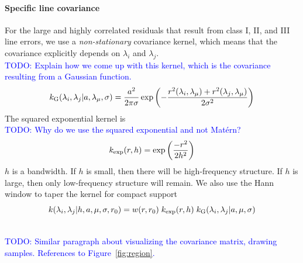 \documentclass[iop,floatfix]{emulateapj}
\newcommand{\matern}{Mat\'{e}rn}
\newcommand{\todo}[1]{ \textcolor{Blue}{\\TODO: #1}}
\begin{document}
\paragraph{Specific line covariance} For the large and highly correlated
 residuals that result from class I, II, and III line errors, we use a
 \emph{non-stationary} covariance kernel, which means that the covariance
 explicitly depends on $\lambda_i$ and $\lambda_j$.
\todo{Explain how we come up with this kernel, which is the covariance
 resulting from a Gaussian function.}
\begin{equation}
  k_{\rm G}(\lambda_i, \lambda_j | a, \lambda_\mu, \sigma) = \frac{a^2}{2 \pi \sigma} \exp \left ( - \frac{r^2(\lambda_i, \lambda_\mu) + r^2(\lambda_j, \lambda_\mu)}{2 \sigma^2}\right )
\end{equation}
The squared exponential kernel is
\todo{Why do we use the squared exponential and not \matern?}
\begin{equation}
  k_{ \rm exp}(r, h) = \exp \left ( \frac{- r^2 }{2 h^2} \right )
\end{equation}
$h$ is a bandwidth. 
If $h$ is small, then there will be high-frequency structure. If $h$ is large,
 then only low-frequency structure will remain. 
We also use the Hann window to taper the kernel for compact support
\begin{equation}
  k(\lambda_i, \lambda_j | h, a, \mu, \sigma, r_0) = w(r, r_0)\; k_{ \rm exp}(r, h) \; k_{\rm G}(\lambda_i, \lambda_j | a, \mu, \sigma)
\end{equation}

\todo{Similar paragraph about visualizing the covariance matrix, drawing samples. References to Figure~\ref{fig:region}.}
\end{document}
